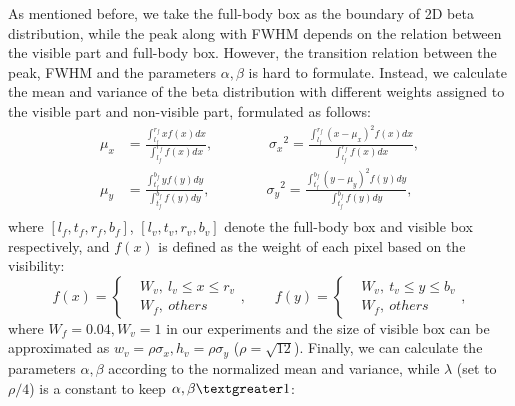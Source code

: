 \documentclass{article}
\begin{document}
As mentioned before, we take the full-body box as the boundary of 2D beta distribution, while the peak along with FWHM depends on the relation between the visible part and full-body box. 
However, the transition relation between the peak, FWHM and the parameters $\alpha, \beta$ is hard to formulate.
Instead, we calculate the mean and variance of the beta distribution with different weights assigned to the visible part and non-visible part, formulated as follows:
\begin{equation}
    \begin{split}
    \mu_x &= \frac{\int_{l_f}^{r_f} xf(x)dx}{\int_{l_f}^{r_f} f(x)dx}, \qquad \qquad
    {\sigma_x}^2 = \frac{\int_{l_f}^{r_f} (x-\mu_x)^2f(x)dx}{\int_{l_f}^{r_f} f(x)dx}, \\
    \mu_y &= \frac{\int_{t_f}^{b_f} y f(y)dy}{\int_{t_f}^{b_f} f(y)dy}, \qquad \qquad
    {\sigma_y}^2 = \frac{\int_{t_f}^{b_f} (y-\mu_y)^2f(y)dy}{\int_{t_f}^{b_f} f(y)dy}, \\
    \end{split}
\end{equation}
where $[l_f, t_f, r_f, b_f]$, $[l_v, t_v, r_v, b_v]$ denote the full-body box and visible box respectively, and $f(x)$ is defined as the weight of each pixel based on the visibility:
\begin{equation}
    f(x)=\left\{
    \begin{aligned}
        & W_v,\  l_v \leq x \leq r_v \\
        & W_f,\  others
    \end{aligned}
    \right.
    ,
    \qquad
    f(y)=\left\{
    \begin{aligned}
        & W_v,\  t_v \leq y \leq b_v\\
        & W_f,\  others
    \end{aligned}
    \right.
    ,
\end{equation}
where $W_f = 0.04, W_v=1$ in our experiments and the size of visible box can be approximated as $w_v = \rho \sigma_x, h_v = \rho \sigma_y$ ($\rho=\sqrt{12}$).
Finally, we can calculate the parameters $\alpha, \beta$ according to the normalized mean and variance, while $\lambda$ (set to $\rho / 4$) is a constant to keep $\alpha, \beta \textgreater 1$:
\end{document}
